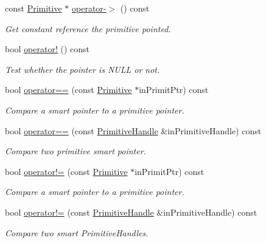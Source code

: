 \begin{DoxyCompactItemize}
const \hyperlink{classPuppy_1_1Primitive}{Primitive} $\ast$ \hyperlink{classPuppy_1_1PrimitiveHandle_a96bc2d4e05e7456402dab94954e3aa19}{operator-\/$>$} () const 
\begin{DoxyCompactList}\small\item\em Get constant reference the primitive pointed. \end{DoxyCompactList}\item 
bool \hyperlink{classPuppy_1_1PrimitiveHandle_ae4a43e20e9fed246e3ccf4db0a2a4821}{operator!} () const 
\begin{DoxyCompactList}\small\item\em Test whether the pointer is N\+U\+L\+L or not. \end{DoxyCompactList}\item 
bool \hyperlink{classPuppy_1_1PrimitiveHandle_a79bbe9c55a986778965a63c1e3c39f7b}{operator==} (const \hyperlink{classPuppy_1_1Primitive}{Primitive} $\ast$in\+Primit\+Ptr) const 
\begin{DoxyCompactList}\small\item\em Compare a smart pointer to a primitive pointer. \end{DoxyCompactList}\item 
bool \hyperlink{classPuppy_1_1PrimitiveHandle_ad9ec731cb2abe6248499ea2e8d273c31}{operator==} (const \hyperlink{classPuppy_1_1PrimitiveHandle}{Primitive\+Handle} \&in\+Primitive\+Handle) const 
\begin{DoxyCompactList}\small\item\em Compare two primitive smart pointer. \end{DoxyCompactList}\item 
bool \hyperlink{classPuppy_1_1PrimitiveHandle_a378f6a3e812a17eb7405edeebec0403d}{operator!=} (const \hyperlink{classPuppy_1_1Primitive}{Primitive} $\ast$in\+Primit\+Ptr) const 
\begin{DoxyCompactList}\small\item\em Compare a smart pointer to a primitive pointer. \end{DoxyCompactList}\item 
bool \hyperlink{classPuppy_1_1PrimitiveHandle_a58698eef8cf454f72eeadc62da386558}{operator!=} (const \hyperlink{classPuppy_1_1PrimitiveHandle}{Primitive\+Handle} \&in\+Primitive\+Handle) const 
\begin{DoxyCompactList}\small\item\em Compare two smart Primitive\+Handles. \end{DoxyCompactList}\item 

\end{DoxyCompactItemize}
